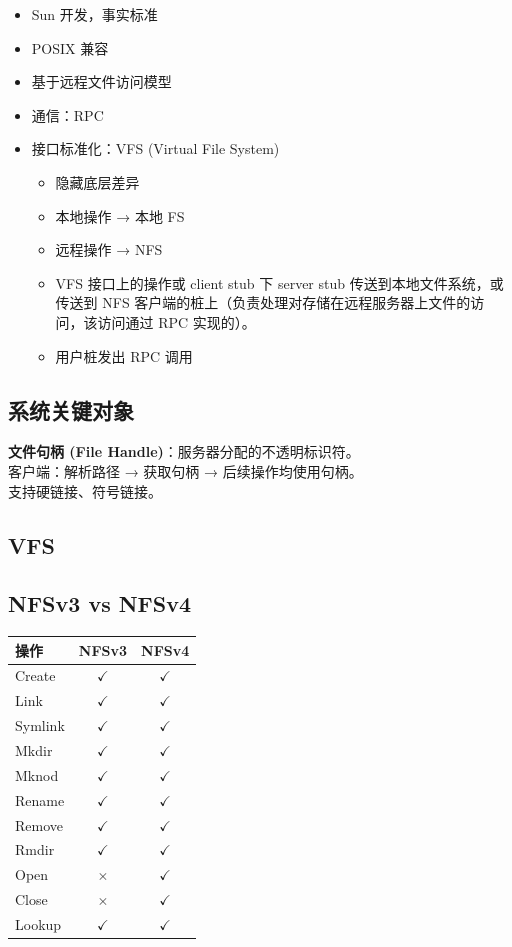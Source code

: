 \begin{itemize}
    \item Sun 开发，事实标准
    \item POSIX 兼容
    \item 基于远程文件访问模型
    \item 通信：RPC
    \item 接口标准化：VFS (Virtual File System)
    \begin{itemize}
        \item 隐藏底层差异
        \item 本地操作 → 本地 FS
        \item 远程操作 → NFS
        \item VFS 接口上的操作或 client stub 下 server stub 传送到本地文件系统，或传送到 NFS 客户端的桩上（负责处理对存储在远程服务器上文件的访问，该访问通过 RPC 实现的）。
        \item 用户桩发出 RPC 调用
    \end{itemize}
\end{itemize}

\subsection{系统关键对象}
\textbf{文件句柄 (File Handle)}：服务器分配的不透明标识符。\\
客户端：解析路径 → 获取句柄 → 后续操作均使用句柄。\\
支持硬链接、符号链接。

\subsection{VFS}

\subsection{NFSv3 vs NFSv4}
\begin{center}
\begin{tabular}{lcc}
\toprule
操作 & NFSv3 & NFSv4 \\
\midrule
Create & $\checkmark$ & $\checkmark$ \\
Link & $\checkmark$ & $\checkmark$ \\
Symlink & $\checkmark$ & $\checkmark$ \\
Mkdir & $\checkmark$ & $\checkmark$ \\
Mknod & $\checkmark$ & $\checkmark$ \\
Rename & $\checkmark$ & $\checkmark$ \\
Remove & $\checkmark$ & $\checkmark$ \\
Rmdir & $\checkmark$ & $\checkmark$ \\
Open & $\times$ & $\checkmark$ \\
Close & $\times$ & $\checkmark$ \\
Lookup & $\checkmark$ & $\checkmark$ \\
\bottomrule
\end{tabular}
\end{center}

